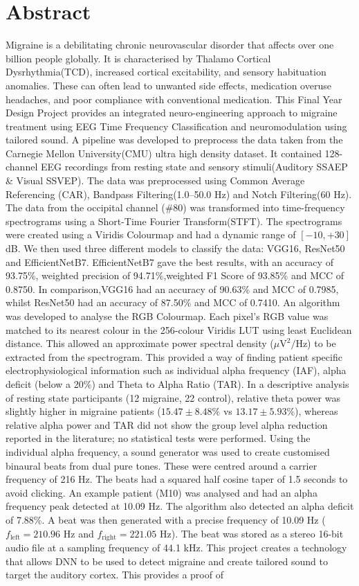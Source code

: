 \documentclass[12pt, a4paper]{report}
\begin{document}
\chapter*{Abstract}
Migraine is a debilitating chronic neurovascular disorder that affects over one billion people globally. It is characterised by Thalamo Cortical Dysrhythmia(TCD), increased cortical excitability, and sensory habituation anomalies. These can often lead to unwanted side effects, medication overuse headaches, and poor compliance with conventional medication. This Final Year Design Project provides an integrated neuro-engineering approach to migraine treatment using EEG Time  Frequency Classification and neuromodulation using tailored sound. A pipeline was developed to preprocess the data taken from the Carnegie Mellon University(CMU) ultra high density dataset. It contained 128-channel EEG recordings from resting state and sensory stimuli(Auditory SSAEP \& Visual SSVEP). The data was preprocessed using Common Average Referencing (CAR), Bandpass Filtering(1.0--50.0 Hz) and Notch Filtering(60 Hz). The data from the occipital channel (\#80) was transformed into time-frequency spectrograms using a Short-Time Fourier Transform(STFT). The spectrograms were created using a Viridis Colourmap and had a dynamic range of $[-10, +30]$ dB. We then used three different models to classify the data: VGG16, ResNet50 and EfficientNetB7. EfficientNetB7 gave the best results, with an accuracy of 93.75\%, weighted precision of 94.71\%,weighted F1 Score of 93.85\% and MCC of 0.8750. In comparison,VGG16 had an accuracy of 90.63\% and MCC of 0.7985, whilst ResNet50 had an accuracy of 87.50\% and MCC of 0.7410. An algorithm was developed to analyse the RGB Colourmap. Each pixel's RGB value was matched to its nearest colour in the 256-colour Viridis LUT using least Euclidean distance. This allowed an approximate power spectral density ($\mu\text{V}^2/\text{Hz}$) to be extracted from the spectrogram. This provided a way of finding patient specific electrophysiological information such as individual alpha frequency (IAF), alpha deficit (below a 20\%) and Theta to Alpha Ratio (TAR). In a descriptive analysis of resting state participants (12 migraine, 22 control), relative theta power was slightly higher in migraine patients ($15.47 \pm 8.48\%$ vs $13.17 \pm 5.93\%$), whereas relative alpha power and TAR did not show the group level alpha reduction reported in the literature; no statistical tests were performed. Using the individual alpha frequency, a sound generator was used to create customised binaural beats from dual pure tones. These were centred around a carrier frequency of 216 Hz. The beats had a squared half cosine taper of 1.5 seconds to avoid clicking. An example patient (M10) was analysed and had an alpha frequency peak detected at 10.09 Hz. The algorithm also detected an alpha deficit of 7.88\%. A beat was then generated with a precise frequency of 10.09 Hz ($f_{\text{left}} = 210.96$ Hz and $f_{\text{right}} = 221.05$ Hz). The beat was stored as a stereo 16-bit audio file at a sampling frequency of 44.1 kHz. This project creates a technology that allows DNN to be used to detect migraine and create tailored sound to target the auditory cortex. This provides a proof of 
\end{document}
